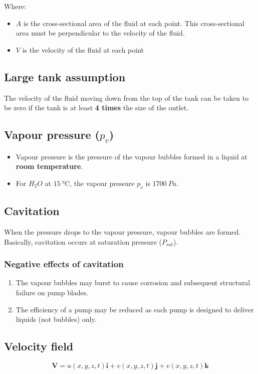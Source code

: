 \documentclass[11pt]{article}
\begin{document}
Where:
\begin{itemize}
\item \(A\) is the cross-sectional area of the fluid at each point. This cross-sectional area must be perpendicular to the velocity of the fluid.
\item \(V\) is the velocity of the fluid at each point
\end{itemize}

\subsection{Large tank assumption}
\label{sec:orgdb2c965}
The velocity of the fluid moving down from the top of the tank can be taken to be zero if the tank is at least \textbf{4 times} the size of the outlet.

\subsection{Vapour pressure (\(p_v\))}
\label{sec:org282775a}
\begin{itemize}
\item Vapour pressure is the pressure of the vapour bubbles formed in a liquid at \textbf{room temperature}.
\item For \(H_{2}O\) at \(\qty{15}{\degreeCelsius}\), the vapour pressure \(p_v\) is \(\qty{1700}{Pa}\).
\end{itemize}

\subsection{Cavitation}
\label{sec:orgff9a787}
When the pressure drops to the vapour pressure, vapour bubbles are formed. Basically, cavitation occurs at saturation pressure (\(P_{sat}\)).

\subsubsection{Negative effects of cavitation}
\label{sec:org9e3b69e}
\begin{enumerate}
\item The vapour bubbles may burst to cause corrosion and subsequent structural failure on pump blades.
\item The efficiency of a pump may be reduced as each pump is designed to deliver liquids (not bubbles) only.
\end{enumerate}

\subsection{Velocity field}
\label{sec:orgdccb390}
\[\boldsymbol{V} = u(x, y, z, t) \boldsymbol{i} + v(x, y, z, t) \boldsymbol{j} + v(x, y, z, t) \boldsymbol{k}\]
\end{document}
